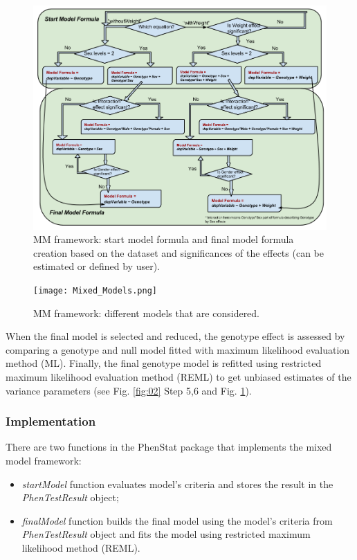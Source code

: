 \documentclass[12pt,a4paper]{article}
\begin{document}
\begin{figure}[!tpb]%
\centerline{\includegraphics[scale=0.5]{Model_Formula.png}}
\caption{MM framework: start model formula and final model formula creation based on the dataset and significances of the effects (can be estimated or defined by user). }\label{fig:03}
\end{figure}

\begin{figure}[!tpb]%
\centerline{\texttt{[image: Mixed\_Models.png]}}
\caption{MM framework: different models that are considered. }\label{fig:04}
\end{figure}

When the final model is selected and reduced, the genotype effect is assessed by comparing a genotype and null model fitted with maximum likelihood evaluation method (ML). Finally, the final genotype model is refitted using restricted maximum likelihood evaluation method (REML) to get unbiased estimates of the variance parameters (see Fig. \ref{fig:02} Step 5,6 and Fig. \ref{fig:03}).   

\subsubsection{Implementation}
\label{sec:MMImplementation}
There are two functions in the PhenStat package that implements the mixed model framework:
\begin{itemize}
\item \textit{startModel} function evaluates model's criteria and stores the result in the \textit{PhenTestResult} object;
\item \textit{finalModel} function builds the final model using the model's criteria from \textit{PhenTestResult} object and fits the model using restricted maximum likelihood method (REML). 
\end{itemize}
\end{document}
